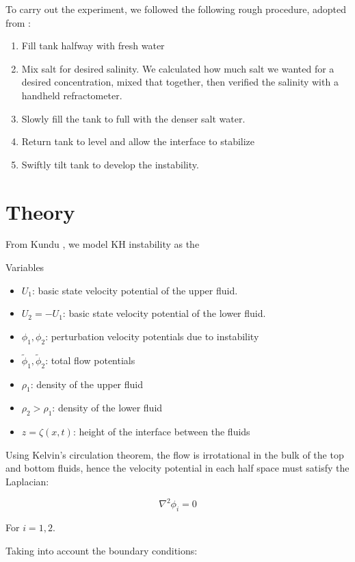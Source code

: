 \documentclass{article}
\begin{document}
To carry out the experiment, we followed the following rough procedure, adopted
from \cite{kh-instability-demo}:

\begin{enumerate}
    \item Fill tank halfway with fresh water
    \item Mix salt for desired salinity. We calculated how much salt we wanted
    for a desired concentration, mixed that together, then verified the salinity
    with a handheld refractometer.
    \item Slowly fill the tank to full with the denser salt water.
    \item Return tank to level and allow the interface to stabilize
    \item Swiftly tilt tank to develop the instability.
\end{enumerate}

\section{Theory}

From Kundu \cite{kundu}, we model KH instability as the %

Variables
\begin{itemize}
    \item \(U_1\): basic state velocity potential of the upper fluid.
    \item \(U_2 = -U_1\): basic state velocity potential of the lower fluid.
    \item \(\phi_1, \phi_2\): perturbation velocity potentials due to instability
    \item \(\tilde \phi_1, \tilde \phi_2\): total flow potentials
    \item \(\rho_1\): density of the upper fluid
    \item \(\rho_2 > \rho_1\): density of the lower fluid
    \item \(z = \zeta(x, t)\): height of the interface between the  fluids
\end{itemize}

Using Kelvin's circulation theorem, the flow is irrotational in the bulk of the
top and bottom fluids, hence the velocity potential in each half space must
satisfy the Laplacian:

\[ \nabla^2 \phi_i = 0\]

For \(i = 1, 2\).

Taking into account the boundary conditions:
\end{document}
